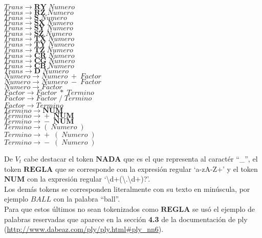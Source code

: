 \documentclass[10pt,a4paper]{article}
\begin{document}
\begin{itemize}
$Trans\rightarrow{}\textbf{RY}\;Numero$\\
$Trans\rightarrow{}\textbf{RZ}\;Numero$\\
$Trans\rightarrow{}\textbf{S}\;Numero$\\
$Trans\rightarrow{}\textbf{SX}\;Numero$\\
$Trans\rightarrow{}\textbf{SY}\;Numero$\\
$Trans\rightarrow{}\textbf{SZ}\;Numero$\\
$Trans\rightarrow{}\textbf{TX}\;Numero$\\
$Trans\rightarrow{}\textbf{TY}\;Numero$\\
$Trans\rightarrow{}\textbf{TZ}\;Numero$\\
$Trans\rightarrow{}\textbf{CR}\;Numero$\\
$Trans\rightarrow{}\textbf{CG}\;Numero$\\
$Trans\rightarrow{}\textbf{CB}\;Numero$\\
$Trans\rightarrow{}\textbf{D}\;Numero$\\
$Numero\rightarrow{}Numero\;+\;Factor$\\
$Numero\rightarrow{}Numero\;-\;Factor$\\
$Numero\rightarrow{}Factor$\\
$Factor\rightarrow{}Factor\;*\;Termino$\\
$Factor\rightarrow{}Factor\;/\;Termino$\\
$Factor\rightarrow{}Termino$\\
$Termino\rightarrow{}\textbf{NUM}$\\
$Termino\rightarrow{}+\;\textbf{NUM}$\\
$Termino\rightarrow{}-\;\textbf{NUM}$\\
$Termino\rightarrow{}(\;Numero\;)$\\
$Termino\rightarrow{}+\;(\;Numero\;)$\\
$Termino\rightarrow{}-\;(\;Numero\;)$\\
\end{itemize}
De $V_t$ cabe destacar el token $\textbf{NADA}$ que es el que representa al caractér ``\_'',  el token $\textbf{REGLA}$ que se corresponde con la expresión regular `\lbrack a-zA-Z\rbrack+' y el token $\textbf{NUM}$ con la expresión regular `\textbackslash d+(\textbackslash .\textbackslash d+)?'.\\
Los demás tokens se corresponden literalmente con su texto en minúscula, por ejemplo $BALL$ con la palabra ``ball''.\\
Para que estos últimos no sean tokenizados como $\textbf{REGLA}$ se usó el ejemplo de palabras reservadas que aparece en la sección \textbf{4.3} de la documentación de ply (\url{http://www.dabeaz.com/ply/ply.html#ply_nn6}).
\end{document}
